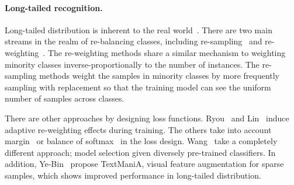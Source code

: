 





\paragraph{Long-tailed recognition.}
Long-tailed distribution is inherent to the real world~\cite{cui2019class,zhang2023deep}.
There are two main streams in the realm of re-balancing classes, including re-sampling~\cite{shen2016relay,park2022majority,kim2020m2m,liu2019large} and re-weighting~\cite{he2009learning,samuel2021distributional, cao2019learning, ren2020balanced, lin2017focal, ryou2019anchor, cui2019class}.
The re-weighting methods share a similar mechanism to weighting minority classes inverse-proportionally to the number of instances. 
The re-sampling methods weight the samples in minority classes by more frequently sampling with replacement so that the training model can see the uniform number of samples across classes.

There are other approaches 
by designing loss functions.
Ryou~\etal\cite{ryou2019anchor} and Lin~\etal\cite{lin2017focal} 
induce adaptive re-weighting effects during training.
The others take into account margin~\cite{cao2019learning} or balance of softmax~\cite{ren2020balanced} in the loss design.
Wang~\etal\cite{wang2021longtailed} take a completely different approach; model selection given diversely pre-trained classifiers.
In addition, Ye-Bin~\etal\cite{yebin2023textmania} propose
TextManiA, visual feature augmentation for sparse samples, which shows improved performance in long-tailed distribution.


